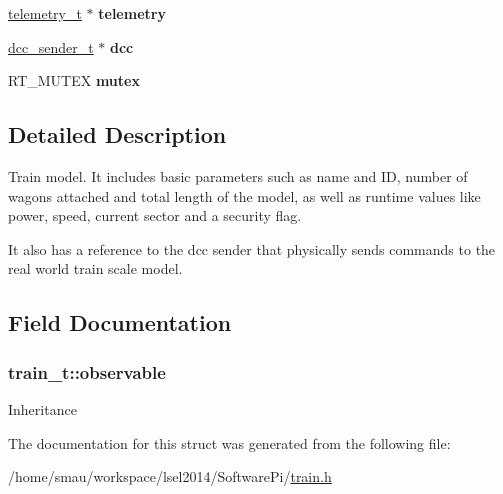 \begin{DoxyCompactItemize}
\item 
\hypertarget{structtrain__t_ad8c29a8f9543d94b27226af5926d2e7f}{\hyperlink{structtelemetry__t}{telemetry\-\_\-t} $\ast$ {\bfseries telemetry}}\label{structtrain__t_ad8c29a8f9543d94b27226af5926d2e7f}

\item 
\hypertarget{structtrain__t_adf987895c09634e53848488117da976e}{\hyperlink{structdcc__sender__t}{dcc\-\_\-sender\-\_\-t} $\ast$ {\bfseries dcc}}\label{structtrain__t_adf987895c09634e53848488117da976e}

\item 
\hypertarget{structtrain__t_acdc9afcb7663d7cae538ed1620c9b0e9}{R\-T\-\_\-\-M\-U\-T\-E\-X {\bfseries mutex}}\label{structtrain__t_acdc9afcb7663d7cae538ed1620c9b0e9}

\end{DoxyCompactItemize}


\subsection{Detailed Description}
Train model. It includes basic parameters such as name and I\-D, number of wagons attached and total length of the model, as well as runtime values like power, speed, current sector and a security flag.

It also has a reference to the dcc sender that physically sends commands to the real world train scale model. 

\subsection{Field Documentation}
\hypertarget{structtrain__t_a39d603215eb7e0ade0ee0fbbb14f0685}{
\subsubsection[{observable}]{ train\-\_\-t\-::observable}}\label{structtrain__t_a39d603215eb7e0ade0ee0fbbb14f0685}
Inheritance 

The documentation for this struct was generated from the following file\-:\begin{DoxyCompactItemize}
\item 
/home/smau/workspace/lsel2014/\-Software\-Pi/\hyperlink{train_8h}{train.\-h}\end{DoxyCompactItemize}
